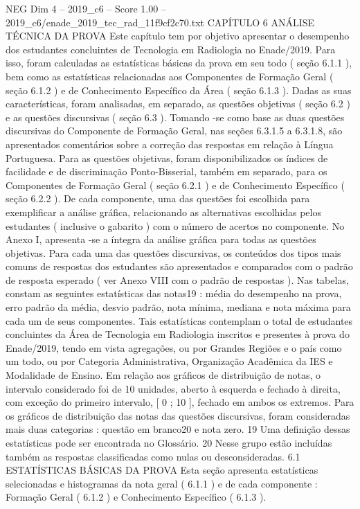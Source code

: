 \begin{textsample}{NEG Dim 4 – 2019\_c6 – Score 1.00 – 2019\_c6/enade\_2019\_tec\_rad\_11f9cf2c70.txt}  \label{ex:f4_neg_260}
CAPÍTULO 6 ANÁLISE TÉCNICA DA PROVA Este capítulo tem por objetivo apresentar o desempenho dos estudantes concluintes de Tecnologia em Radiologia no Enade/2019.
Para isso, foram calculadas as estatísticas básicas da prova em seu todo ( seção 6.1.1 ), bem como as estatísticas relacionadas aos Componentes de Formação Geral ( seção 6.1.2 ) e de Conhecimento Específico da Área ( seção 6.1.3 ).
Dadas as suas características, foram analisadas, em separado, as questões objetivas ( seção 6.2 ) e as questões discursivas ( seção 6.3 ).
Tomando -se como base as duas questões discursivas do Componente de Formação Geral, nas seções 6.3.1.5 a 6.3.1.8, são apresentados comentários sobre a correção das respostas em relação à Língua Portuguesa.
Para as questões objetivas, foram disponibilizados os índices de facilidade e de discriminação Ponto-Bisserial, também em separado, para os Componentes de Formação Geral ( seção 6.2.1 ) e de Conhecimento Específico ( seção 6.2.2 ).
De cada componente, uma das questões foi escolhida para exemplificar a análise gráfica, relacionando as alternativas escolhidas pelos estudantes ( inclusive o gabarito ) com o número de acertos no componente.
No Anexo I, apresenta -se a íntegra da análise gráfica para todas as questões objetivas.
Para cada uma das questões discursivas, os conteúdos dos tipos mais comuns de respostas dos estudantes são apresentados e comparados com o padrão de resposta esperado ( ver Anexo VIII com o padrão de respostas ).
Nas tabelas, constam as seguintes estatísticas das notas19 : média do desempenho na prova, erro padrão da média, desvio padrão, nota mínima, mediana e nota máxima para cada um de seus componentes.
Tais estatísticas contemplam o total de estudantes concluintes da Área de Tecnologia em Radiologia inscritos e presentes à prova do Enade/2019, tendo em vista agregações, ou por Grandes Regiões e o país como um todo, ou por Categoria Administrativa, Organização Acadêmica da IES e Modalidade de Ensino.
Em relação aos gráficos de distribuição de notas, o intervalo considerado foi de 10 unidades, aberto à esquerda e fechado à direita, com exceção do primeiro intervalo, [ 0 ; 10 ], fechado em ambos os extremos.
Para os gráficos de distribuição das notas das questões discursivas, foram consideradas mais duas categorias : questão em branco20 e nota zero. 19 Uma definição dessas estatísticas pode ser encontrada no Glossário. 20 Nesse grupo estão incluídas também as respostas classificadas como nulas ou desconsideradas. 6.1 ESTATÍSTICAS BÁSICAS DA PROVA Esta seção apresenta estatísticas selecionadas e histogramas da nota geral ( 6.1.1 ) e de cada componente : Formação Geral ( 6.1.2 ) e Conhecimento Específico ( 6.1.3 ).

\end{textsample}
